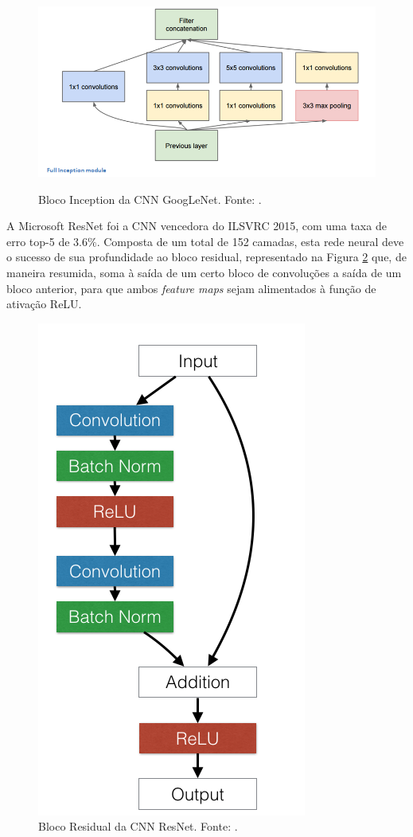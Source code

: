 \begin{figure}[h!]
	\centering
	\caption{Bloco Inception da CNN GoogLeNet. Fonte: \cite{9dlpapers}.}
	\includegraphics[width=0.7\linewidth]{img/GoogLeNet}
	\label{fig:bloco_inception}
\end{figure}



A Microsoft ResNet foi a CNN vencedora do ILSVRC 2015, com uma taxa de erro top-5 de $3.6\%$. Composta de um total de 152 camadas, esta rede neural deve o sucesso de sua profundidade ao bloco residual, representado na Figura \ref{fig:bloco_residual} que, de maneira resumida, soma à saída de um certo bloco de convoluções a saída de um bloco anterior, para que ambos \emph{feature maps} sejam alimentados à função de ativação ReLU.

\begin{figure}[h!]
\centering
\caption{Bloco Residual da CNN ResNet. Fonte: \cite{torch:resnet}.}\label{fig:bloco_residual}
\includegraphics[height=0.3\lineheight]{img/resnets_modelvariants}
\end{figure}

